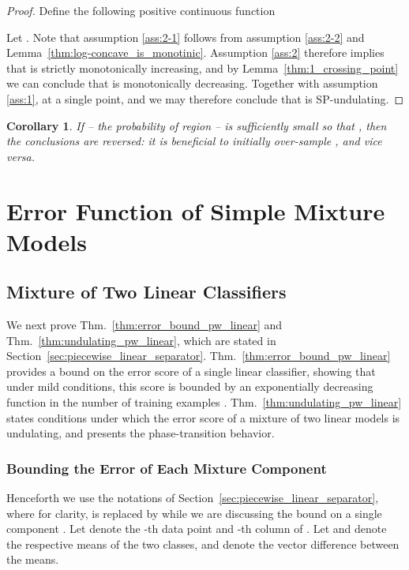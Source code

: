 \documentclass{article}
\newtheorem{corollary}{Corollary}
\begin{document}
\begin{proof}
Define the following positive continuous function

Let . Note that assumption \ref{ass:2-1} follows from assumption \ref{ass:2-2} and Lemma~\ref{thm:log-concave_is_monotinic}.
Assumption \ref{ass:2} therefore implies that  is strictly monotonically increasing, and by Lemma~\ref{thm:1_crossing_point} we can conclude that  is monotonically decreasing. Together with assumption \ref{ass:1},  at a single point, and we may therefore conclude that  is SP-undulating.
\end{proof}

\begin{corollary}
If  -- the probability of region  -- is sufficiently small so that , then the conclusions are reversed: it is beneficial to initially over-sample , and vice versa. 
\end{corollary}



\section{Error Function of Simple Mixture Models}
\label{app:simple_mixture_models_error_func}

\subsection{Mixture of Two Linear Classifiers}
\label{app:linear-model}

We next prove Thm.~\ref{thm:error_bound_pw_linear} and Thm.~\ref{thm:undulating_pw_linear}, which are stated in Section~\ref{sec:piecewise_linear_separator}. Thm.~\ref{thm:error_bound_pw_linear} provides a bound on the error score of a single linear classifier, showing that under mild conditions, this score is bounded by an exponentially decreasing function in the number of training examples . Thm.~\ref{thm:undulating_pw_linear} states  conditions under which the error score of a mixture of two linear models  is undulating, and presents the phase-transition behavior. 






\subsubsection{Bounding the Error of Each Mixture Component}
Henceforth we use the notations of Section~\ref{sec:piecewise_linear_separator}, where for clarity,  is replaced by  while we are discussing the bound on a single component . Let  denote the -th data point and -th column of . Let  and  denote the respective means of the two classes, and  denote the vector difference between the means. 
\end{document}
